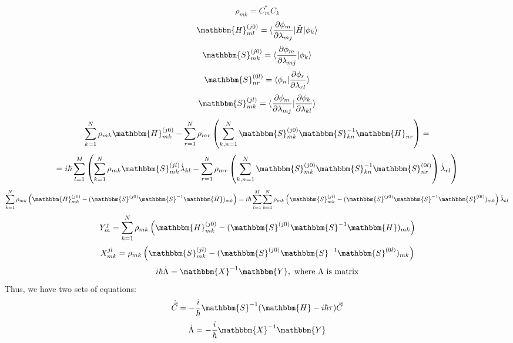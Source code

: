 $$\rho_{mk} = C_m^*C_k$$
$$\mathbbm{H}_{ml}^{(j0)}=\langle\frac{\partial\phi_m}{\partial\lambda_{mj}}|\hat{H}|\phi_k\rangle$$
$$\mathbbm{S}_{mk}^{(j0)}=\langle\frac{\partial\phi_m}{\partial\lambda_{mj}}|\phi_k\rangle$$
$$\mathbbm{S}_{nr}^{(0l)}=\langle\phi_n|\frac{\partial\phi_r}{\partial\lambda_{rl}}\rangle$$
$$\mathbbm{S}_{mk}^{(jl)}=\langle\frac{\partial\phi_m}{\partial\lambda_{mj}}|%
				 \frac{\partial\phi_k}{\partial\lambda_{kl}}\rangle$$
$$\sum_{k=1}^N\rho_{mk}\mathbbm{H}_{mk}^{(j0)}-%
  \sum_{r=1}^N\rho_{mr}\left(\sum_{k,n=1}^N\mathbbm{S}_{mk}^{(j0)}\mathbbm{S}_{kn}^{-1}\mathbbm{H}_{nr}\right)=$$
$$=i\hbar\sum_{l=1}^M\left(\sum_{k=1}^N\rho_{mk}\mathbbm{S}_{mk}^{(jl)}\dot{\lambda}_{kl}-%
\sum_{r=1}^N\rho_{mr}\left(\sum_{k,n=1}^{N}\mathbbm{S}_{mk}^{(j0)}\mathbbm{S}_{kn}^{-1}\mathbbm{S}_{nr}^{(0l)}\right)\dot{\lambda}_{rl}\right)$$
$$\sum_{k=1}^N\rho_{mk}\left(\mathbbm{H}_{mk}^{(j0)}-%
	                     (\mathbbm{S}^{(j0)}\mathbbm{S}^{-1}\mathbbm{H})_{mk} \right)=%
i\hbar\sum_{l=1}^M\sum_{k=1}^N\rho_{mk}\left(\mathbbm{S}_{mk}^{(jl)}-%
					     (\mathbbm{S}^{(j0)}\mathbbm{S}^{-1}\mathbbm{S}^{(0l)})_{mk}\right)\dot{\lambda}_{kl}$$
$$Y_{m}^j=\sum_{k=1}^N\rho_{mk}\left(\mathbbm{H}_{mk}^{(j0)}-%
	                     (\mathbbm{S}^{(j0)}\mathbbm{S}^{-1}\mathbbm{H})_{mk} \right)$$
$$X_{mk}^{jl}=\rho_{mk}\left(\mathbbm{S}_{mk}^{(jl)}-%
					     (\mathbbm{S}^{(j0)}\mathbbm{S}^{-1}\mathbbm{S}^{(0l)})_{mk}\right)$$
$$i\hbar\dot{\Lambda} = \mathbbm{X}^{-1}\mathbbm{Y},\text{ where }\Lambda\text{ is matrix}$$
Thus, we have two sets of equations:
$$\dot{\vec{C}} = -\frac{i}{\hbar}\mathbbm{S}^{-1}(\mathbbm{H}-i\hbar\tau)\vec{C}$$
$$\dot{\Lambda} = -\frac{i}{\hbar}\mathbbm{X}^{-1}\mathbbm{Y}$$

